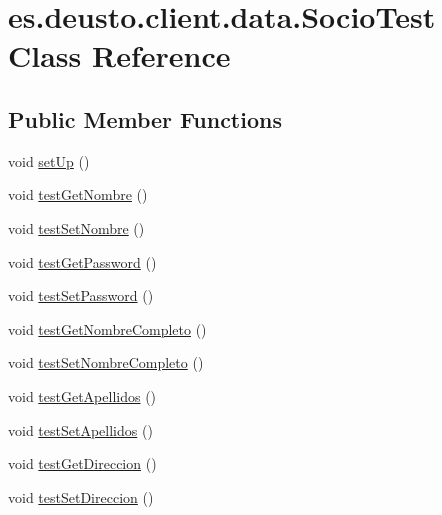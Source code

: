 \hypertarget{classes_1_1deusto_1_1client_1_1data_1_1_socio_test}{}\section{es.\+deusto.\+client.\+data.\+Socio\+Test Class Reference}
\label{classes_1_1deusto_1_1client_1_1data_1_1_socio_test}
\subsection*{Public Member Functions}
\begin{DoxyCompactItemize}
\item 
void \mbox{\hyperlink{classes_1_1deusto_1_1client_1_1data_1_1_socio_test_a00c9e6325c474a93dcb7dd384cf36183}{set\+Up}} ()
\item 
void \mbox{\hyperlink{classes_1_1deusto_1_1client_1_1data_1_1_socio_test_a50a29cf81bdfbac48f613b17b67a0ae6}{test\+Get\+Nombre}} ()
\item 
void \mbox{\hyperlink{classes_1_1deusto_1_1client_1_1data_1_1_socio_test_a53e68dbe9629fa4fd304fda0912353a4}{test\+Set\+Nombre}} ()
\item 
void \mbox{\hyperlink{classes_1_1deusto_1_1client_1_1data_1_1_socio_test_a3c56493920a815b8982a3d19b8218b94}{test\+Get\+Password}} ()
\item 
void \mbox{\hyperlink{classes_1_1deusto_1_1client_1_1data_1_1_socio_test_a4bc532c5d38dd1f8b069f949123085ac}{test\+Set\+Password}} ()
\item 
void \mbox{\hyperlink{classes_1_1deusto_1_1client_1_1data_1_1_socio_test_a5ebaa1128fb9bc5fe4aa4a81e188af70}{test\+Get\+Nombre\+Completo}} ()
\item 
void \mbox{\hyperlink{classes_1_1deusto_1_1client_1_1data_1_1_socio_test_ab242824a499411a68b13e206bfac1b38}{test\+Set\+Nombre\+Completo}} ()
\item 
void \mbox{\hyperlink{classes_1_1deusto_1_1client_1_1data_1_1_socio_test_ae47187d620081736168ccdda59dd0da5}{test\+Get\+Apellidos}} ()
\item 
void \mbox{\hyperlink{classes_1_1deusto_1_1client_1_1data_1_1_socio_test_af35a71b5cdde6ebffb3aa5ca226293d4}{test\+Set\+Apellidos}} ()
\item 
void \mbox{\hyperlink{classes_1_1deusto_1_1client_1_1data_1_1_socio_test_a609567ac634481dc21bbea62643cc865}{test\+Get\+Direccion}} ()
\item 
void \mbox{\hyperlink{classes_1_1deusto_1_1client_1_1data_1_1_socio_test_a0d8c81e86b28913b378134fd38d61f23}{test\+Set\+Direccion}} ()

\end{DoxyCompactItemize}
